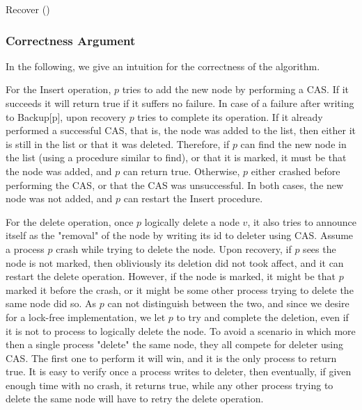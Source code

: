 \begin{procedure}[b]
	\caption{Recover ()}
	
	
\end{procedure}

\subsubsection*{Correctness Argument}
In the following, we give an intuition for the correctness of the algorithm.

For the Insert operation, $p$ tries to add the new node by performing a CAS. If it succeeds it will return true if it suffers no failure. In case of a failure after writing to Backup[p], upon recovery $p$ tries to complete its operation. If it already performed a successful CAS, that is, the node was added to the list, then either it is still in the list or that it was deleted. Therefore, if $p$ can find the new node in the list (using a procedure similar to find), or that it is marked, it must be that the node was added, and $p$ can return true. Otherwise, $p$ either crashed before performing the CAS, or that the CAS was unsuccessful. In both cases, the new node was not added, and $p$ can restart the Insert procedure.

For the delete operation, once $p$ logically delete a node $v$, it also tries to announce itself as the "removal" of the node by writing its id to deleter using CAS. Assume a process $p$ crash while trying to delete the node. Upon recovery, if $p$ sees the node is not marked, then obliviously its deletion did not took affect, and it can restart the delete operation. However, if the node is marked, it might be that $p$ marked it before the crash, or it might be some other process trying to delete the same node did so. As $p$ can not distinguish between the two, and since we desire for a lock-free implementation, we let $p$ to try and complete the deletion, even if it is not to process to logically delete the node. To avoid a scenario in which more then a single process "delete" the same node, they all compete for deleter using CAS. The first one to perform it will win, and it is the only process to return true. It is easy to verify once a process writes to deleter, then eventually, if given enough time with no crash, it returns true, while any other process trying to delete the same node will have to retry the delete operation.


